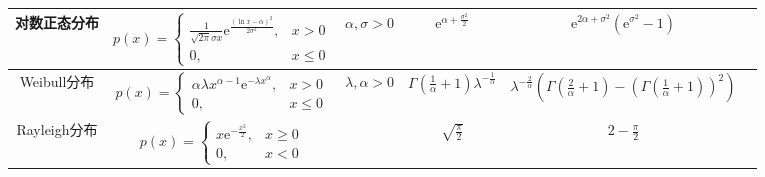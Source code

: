 \documentclass[lang = cn, scheme = chinese, thmcnt = section]{elegantbook}
\begin{document}
\begin{table}[htbp]
{\begin{tabular}{|c|c|c|c|c|c|}
			\hline
			对数正态分布 & $p(x)=\begin{cases}\frac{1}{\sqrt{2\pi}\sigma x}\mathrm{e}^{\frac{(\ln x-\alpha)^2}{2\sigma^2}},&x>0\\0,&x\le0\end{cases}$ & $\alpha,\sigma>0$ & $\mathrm{e}^{\alpha+\frac{\sigma^2}{2}}$ & $\mathrm{e}^{2\alpha+\sigma^2}(\mathrm{e}^{\sigma^2}-1)$ &  \\
			\hline
			Weibull分布 & $p(x)=\begin{cases}\alpha\lambda x^{\alpha-1}\mathrm{e}^{-\lambda x^{\alpha}},&x>0\\0,&x\le0\end{cases}$ & $\lambda,\alpha>0$ & $\Gamma(\frac{1}{\alpha}+1)\lambda^{-\frac{1}{\alpha}}$ & $\lambda^{-\frac{2}{\alpha}}(\Gamma(\frac{2}{\alpha}+1)-(\Gamma(\frac{1}{\alpha}+1))^2)$ &  \\
			\hline
			Rayleigh分布 & $p(x)=\begin{cases}x\mathrm{e}^{-\frac{x^2}{2}},&x\ge 0\\0,&x<0\end{cases}$ &  & $\sqrt{\frac{\pi}{2}}$ & $2-\frac{\pi}{2}$ &  \\
			\hline
	\end{tabular}}
\end{table}
\end{document}
